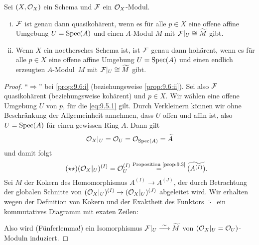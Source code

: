 \begin{prop}
\label{prop:9.6}
	Sei $(X,\mathcal{O}_X)$ ein Schema und $\mathcal{F}$ ein $\mathcal{O}_X$-Modul.
	\begin{enumerate}[i)]
		\item\label{prop:9.6:i} $\mathcal{F}$ ist genau dann quasikohärent, wenn es für alle $p\in X$ eine offene affine Umgebung $U=\operatorname{Spec}(A)$ und einen $A$-Modul $M$ mit $\mathcal{F}\vert_U \cong \widetilde{M}$ gibt.
		\item\label{prop:9.6:ii} Wenn $X$ ein noethersches Schema ist, ist $\mathcal{F}$ genau dann hohärent, wenn es für alle $p\in X$ eine offene affine Umgebung $U=\operatorname{Spec}(A)$ und einen endlich erzeugten $A$-Modul~$M$ mit $\mathcal{F}\vert_U \cong \widetilde{M}$ gibt.
	\end{enumerate}
	\begin{proof}
		\enquote{$\Longrightarrow$} bei \ref{prop:9.6:i} (beziehungsweise \ref{prop:9.6:ii}). Sei also $\mathcal{F}$ quasikohärent (beziehungsweise kohärent) und $p\in X$. Wir wählen eine offene Umgebung $U$ von $p$, für die \eqref{eq:9.5.1} gilt. Durch Verkleinern können wir ohne Beschränkung der Allgemeinheit annehmen, dass $U$ offen und affin ist, also $U= \operatorname{Spec}(A)$ für einen gewissen Ring $A$. Dann gilt
		\[
			\mathcal{O}_X\vert_U = \mathcal{O}_U = \mathcal{O}_{\operatorname{Spec}(A)} = \widetilde{A}
		\]
		und damit folgt
		\begin{equation*}
		\label{eq:9.6.1}\tag{$\star\star$}
			(\mathcal{O}_X\vert_U)^{(I)} = \mathcal{O}_U^{(I)} \overset{\text{Proposition~\ref{prop:9.3}}}{=} \widetilde{(A^{(I)})}.
		\end{equation*}
		Sei $M$ der Kokern des Homomorphismus $A^{(I)}\to A^{(J)}$, der durch Betrachtung der globalen Schnitte von $(\mathcal{O}_X\vert_U)^{(I)}\to (\mathcal{O}_X\vert_U)^{(J)}$ abgeleitet wird. Wir erhalten wegen der Definition von Kokern und der Exaktheit des Funktors $\widetilde{\;\cdot\;}$ ein kommutatives Diagramm mit exaten Zeilen:
		\begin{center}
		\end{center}
		Also wird (Fünferlemma!) ein Isomorphismus $\mathcal{F}\vert_U \overset{\sim}{\longrightarrow} \widetilde{M}$ von $(\mathcal{O}_X\vert_U = \mathcal{O}_U)$-Moduln induziert.


\end{proof}
\end{prop}

